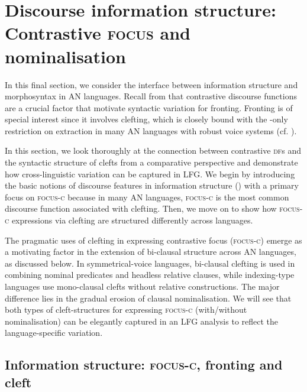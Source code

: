 \documentclass[output=paper,chinesefont]{../langscibook}
\begin{document}
\section{Discourse information structure: Contrastive \textsc{focus} and nominalisation }
\label{sec:Austronesian:6}

In this final section, we consider the interface between information structure and morphosyntax in AN languages. Recall from  that contrastive discourse functions are a crucial factor that motivate syntactic variation for fronting. Fronting is of special interest since it involves clefting, which is closely bound with the \SUBJ-only restriction on extraction in many AN languages with robust voice systems (cf. ). 

In this section, we look thoroughly at the connection between contrastive \textsc{df}s and the syntactic structure of clefts from a comparative perspective and demonstrate how cross-linguistic variation can be captured in LFG. We begin by introducing the basic notions of discourse features in information structure () with a primary focus on \textsc{focus-c} because in many AN languages, \textsc{focus-c} is the most common discourse function associated with clefting.  Then, we move on to show how \textsc{focus-c} expressions via clefting are structured differently across languages.

\hspace*{-3.4pt}The pragmatic uses of clefting in expressing contrastive focus (\textsc{focus-c}) emerge as a motivating factor in the extension of bi-clausal structure  across AN languages, as discussed below. In symmetrical-voice languages, bi-clausal clefting is used in combining nominal predicates and headless relative clauses, while indexing-type languages use mono-clausal clefts without relative constructions. The major difference lies in the gradual erosion of clausal nominalisation. We will see that both types of cleft-structures for expressing \textsc{focus-c} (with/without nominalisation) can be elegantly captured in an LFG analysis to reflect the language-specific variation.

\subsection{Information structure: \textsc{focus-c}, fronting and cleft}
\label{sec:Austronesian:6.1}
\end{document}
